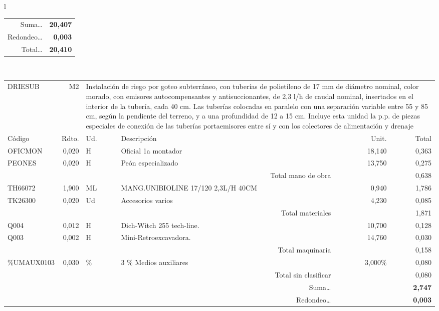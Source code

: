 \documentclass{book}%
\begin{document}
\begin{longtable}{l}
\begin{tabular}{l r l p{60mm} r r}
\multicolumn{4}{r}{Suma\ldots}&\multicolumn{2}{r}{\textbf{    20,407}}\\%
\multicolumn{4}{r}{Redondeo\ldots}&\multicolumn{2}{r}{\textbf{     0,003}}\\%
\multicolumn{4}{r}{Total\ldots}&\multicolumn{2}{r}{\textbf{    20,410}}\\%
\end{tabular}\\%
\begin{tabular}{l r l p{60mm} r r}%
DRIESUB&M2&\multicolumn{4}{p{95mm}}{Instalación de riego por goteo subterráneo, con tuberías de polietileno de 17 mm de diámetro nominal, color morado, con emisores autocompensantes y antisuccionantes, de 2,3 l/h de caudal nominal, insertados en el interior de la tubería, cada 40 cm. Las tuberías colocadas en paralelo con una separación variable entre 55 y 85 cm, según  la  pendiente del terreno, y a una profundidad de 12 a 15 cm. Incluye esta unidad la p.p. de piezas especiales de conexión de las tuberías portaemisores entre sí y con los colectores de alimentación  y drenaje}\\%
Código&Rdto.&Ud.&Descripción&Unit.&Total\\%
\hline%
OFICMON&     0,020&H&Oficial 1a montador&    18,140&     0,363\\%
PEONES&     0,020&H&Peón especializado&    13,750&     0,275\\%
\multicolumn{4}{r}{Total mano de obra}&&     0,638\\%
TH66072&     1,900&ML&MANG.UNIBIOLINE 17/120 2,3L/H 40CM&     0,940&     1,786\\%
TK26300&     0,020&Ud&Accesorios varios&     4,230&     0,085\\%
\multicolumn{4}{r}{Total materiales}&&     1,871\\%
Q004&     0,012&H&Dich{-}Witch 255 tech{-}line.&    10,700&     0,128\\%
Q003&     0,002&H&Mini{-}Retroexcavadora.&    14,760&     0,030\\%
\multicolumn{4}{r}{Total maquinaria}&&     0,158\\%
\%UMAUX0103&     0,030&\%&3 \% Medios auxiliares&     3,000\%&     0,080\\%
\multicolumn{4}{r}{Total sin clasificar}&&     0,080\\%
\multicolumn{4}{r}{Suma\ldots}&\multicolumn{2}{r}{\textbf{     2,747}}\\%
\multicolumn{4}{r}{Redondeo\ldots}&\multicolumn{2}{r}{\textbf{     0,003}}\\%

\end{tabular}
\end{longtable}
\end{document}
